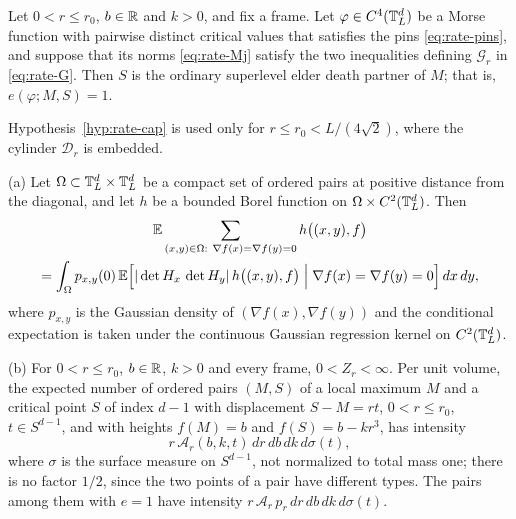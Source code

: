 \begin{hypothesis}\label{hyp:rate-cap}
Let $0<r\le r_0$, $b\in\mathbb R$ and $k>0$, and fix a frame. Let $\varphi\in C^4(\mathbb T^d_L)$ be a Morse function with pairwise distinct critical values that satisfies the pins \eqref{eq:rate-pins}, and suppose that its norms \eqref{eq:rate-Mj} satisfy the two inequalities defining $\mathcal G_r$ in \eqref{eq:rate-G}. Then $S$ is the ordinary superlevel elder death partner of $M$; that is, $e(\varphi;M,S)=1$.
\end{hypothesis}

Hypothesis~\ref{hyp:rate-cap} is used only for $r\le r_0<L/(4\sqrt2)$, where the cylinder $\mathcal D_r$ is embedded.

\begin{hypothesis}\label{hyp:rate-KR}
\textup{(a)} Let $\Omega\subset\mathbb T^d_L\times\mathbb T^d_L$ be a compact set of ordered pairs at positive distance from the diagonal, and let $h$ be a bounded Borel function on $\Omega\times C^2(\mathbb T^d_L)$. Then
\begin{multline}\label{eq:rate-KR}
\mathbb E\sum_{(x,y)\in\Omega:\ \nabla f(x)=\nabla f(y)=0}h\bigl((x,y),f\bigr)\\
=\int_\Omega p_{x,y}(0)\,\mathbb E\Bigl[|\det H_x\,\det H_y|\,h\bigl((x,y),f\bigr)\Bigm|\nabla f(x)=\nabla f(y)=0\Bigr]\,dx\,dy,
\end{multline}
where $p_{x,y}$ is the Gaussian density of $(\nabla f(x),\nabla f(y))$ and the conditional expectation is taken under the continuous Gaussian regression kernel on $C^2(\mathbb T^d_L)$.

\textup{(b)} For $0<r\le r_0$, $b\in\mathbb R$, $k>0$ and every frame, $0<Z_r<\infty$. Per unit volume, the expected number of ordered pairs $(M,S)$ of a local maximum $M$ and a critical point $S$ of index $d-1$ with displacement $S-M=rt$, $0<r\le r_0$, $t\in S^{d-1}$, and with heights $f(M)=b$ and $f(S)=b-kr^3$, has intensity
\begin{equation}\label{eq:rate-intensity}
r\,\mathcal A_r(b,k,t)\,dr\,db\,dk\,d\sigma(t),
\end{equation}
where $\sigma$ is the surface measure on $S^{d-1}$, not normalized to total mass one; there is no factor $1/2$, since the two points of a pair have different types. The pairs among them with $e=1$ have intensity $r\,\mathcal A_r\,p_r\,dr\,db\,dk\,d\sigma(t)$.


\end{hypothesis}

